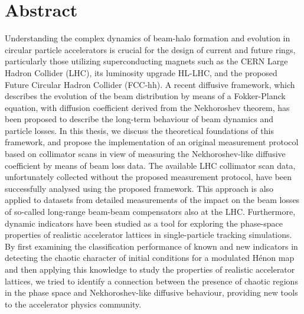 \thispagestyle{empty}
\chapter*{Abstract} 

Understanding the complex dynamics of beam-halo formation and evolution in circular particle accelerators is crucial for the design of current and future rings, particularly those utilizing superconducting magnets such as the CERN Large Hadron Collider (LHC), its luminosity upgrade HL-LHC, and the proposed Future Circular Hadron Collider (FCC-hh).
 A recent diffusive framework, which describes the evolution of the beam distribution by means of a Fokker-Planck equation, with diffusion coefficient derived from the Nekhoroshev theorem, has been proposed to describe the long-term behaviour of beam dynamics and particle losses.
 In this thesis, we discuss the theoretical foundations of this framework, and propose the implementation of an original measurement protocol based on collimator scans in view of measuring the Nekhoroshev-like diffusive coefficient by means of beam loss data.
 The available LHC collimator scan data, unfortunately collected without the proposed measurement protocol, have been successfully analysed using the proposed framework. This approach is also applied to datasets from detailed measurements of the impact on the beam losses of so-called long-range beam-beam compensators also at the LHC. 
 Furthermore, dynamic indicators have been studied as a tool for exploring the phase-space properties of realistic accelerator lattices in single-particle tracking simulations.
 By first examining the classification performance of known and new indicators in detecting the chaotic character of initial conditions for a modulated Hénon map and then applying this knowledge to study the properties of realistic accelerator lattices, we tried to identify a connection between the presence of chaotic regions in the phase space and Nekhoroshev-like diffusive behaviour, providing new tools to the accelerator physics community.


